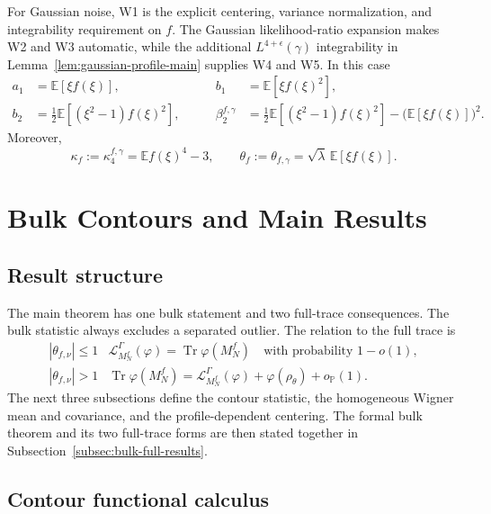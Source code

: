 \documentclass[10pt,a4paper]{amsart}
\newcommand{\E}{\mathbb E}
\newcommand{\Tr}{\operatorname{Tr}}
\begin{document}
For Gaussian noise, W1 is the explicit centering, variance normalization, and
integrability requirement on $f$.  The Gaussian likelihood-ratio expansion
makes W2 and W3 automatic, while the additional
$L^{4+\epsilon}(\gamma)$ integrability in
Lemma~\ref{lem:gaussian-profile-main} supplies W4 and W5.  In this case
\begin{equation}\label{eq:Gaussian-coefficients-summary}
 \begin{aligned}
 a_1&=\E[\xi f(\xi)],
 &\qquad b_1&=\E[\xi f(\xi)^2],\\
 b_2&=\frac12\E[(\xi^2-1)f(\xi)^2],
 &\qquad \beta_2^{f,\gamma}
 &=\frac12\E[(\xi^2-1)f(\xi)^2]
  -\bigl(\E[\xi f(\xi)]\bigr)^2.
 \end{aligned}
\end{equation}
Moreover,
\begin{equation}\label{eq:Gaussian-kappa-theta-summary}
 \kappa_f:=\kappa_4^{f,\gamma}=\E f(\xi)^4-3,
 \qquad
 \theta_f:=\theta_{f,\gamma}
 =\sqrt\lambda\,\E[\xi f(\xi)].
\end{equation}
\section{Bulk Contours and Main Results}
\label{sec:bulk-main-results}

\subsection{Result structure}

The main theorem has one bulk statement and two full-trace consequences.  The
bulk statistic always excludes a separated outlier.  The relation to the full
trace is
\[
\begin{array}{c|c}
 |\theta_{f,\nu}|\leq1
 & \mathcal L_{M_N^f}^{\Gamma}(\varphi)=\Tr\varphi(M_N^f)
   \quad\text{with probability }1-o(1),\\[2mm]
 |\theta_{f,\nu}|>1
 & \Tr\varphi(M_N^f)
   =\mathcal L_{M_N^f}^{\Gamma}(\varphi)+\varphi(\rho_\theta)+o_{\mathbb P}(1).
\end{array}
\]
The next three subsections define the contour statistic, the homogeneous
Wigner mean and covariance, and the profile-dependent centering.  The formal
bulk theorem and its two full-trace forms are then stated together in
Subsection~\ref{subsec:bulk-full-results}.

\subsection{Contour functional calculus}
\end{document}
